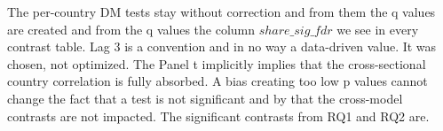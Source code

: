 %
The per-country DM tests stay without correction and from them the q values are created and from the q values the column $share\_sig\_fdr$ we see in every contrast table. Lag 3 is a convention and in no way a data-driven value. It was chosen, not optimized. The Panel t implicitly implies that the cross-sectional country correlation is fully absorbed.
%
A bias creating too low p values cannot change the fact that a test is not significant and by that the cross-model contrasts are not impacted. The significant contrasts from RQ1 and RQ2 are.
%


